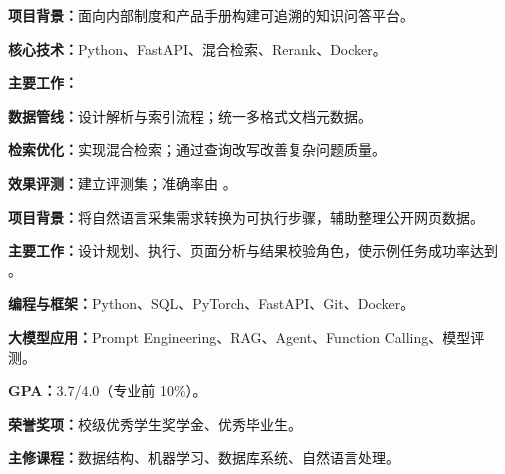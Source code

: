 \ExampleProjectOne
\begin{resumeitems}
  \item \textbf{项目背景：}面向内部制度和产品手册构建可追溯的知识问答平台。
  \item \textbf{核心技术：}Python、FastAPI、混合检索、Rerank、Docker。
  \item \textbf{主要工作：}
    \begin{resumedetails}
      \item \textbf{数据管线：}设计解析与索引流程；统一多格式文档元数据。
      \item \textbf{检索优化：}实现混合检索；通过查询改写改善复杂问题质量。
      \item \textbf{效果评测：}建立评测集；准确率由 。
    \end{resumedetails}
\end{resumeitems}

\resumeprojectdivider
\ExampleProjectTwo
\begin{resumeitems}
  \item \textbf{项目背景：}将自然语言采集需求转换为可执行步骤，辅助整理公开网页数据。
  \item \textbf{主要工作：}设计规划、执行、页面分析与结果校验角色，使示例任务成功率达到 。
\end{resumeitems}

\begin{resumeitems}
  \item \textbf{编程与框架：}Python、SQL、PyTorch、FastAPI、Git、Docker。
  \item \textbf{大模型应用：}Prompt Engineering、RAG、Agent、Function Calling、模型评测。
\end{resumeitems}

\begin{resumeitems}
  \item \textbf{GPA：}3.7/4.0（专业前 10\%）。
  \item \textbf{荣誉奖项：}校级优秀学生奖学金、优秀毕业生。
  \item \textbf{主修课程：}数据结构、机器学习、数据库系统、自然语言处理。
\end{resumeitems}

\begin{resumeawards}
\end{resumeawards}
